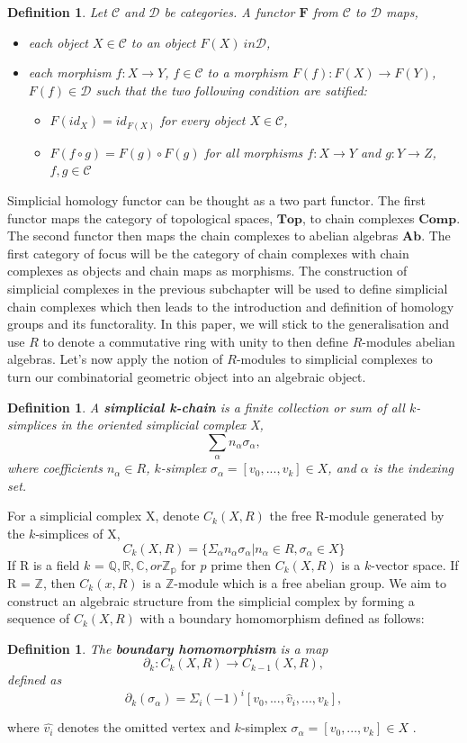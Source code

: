 \documentclass{article}
\newcommand{\be}{\begin{equation}}
\newcommand{\ee}{\end{equation}}
\newtheorem{definition}[theorem]{Definition}
\begin{document}
\begin{definition} Let $\mathcal{C}$ and $\mathcal{D}$ be categories. A functor $\textbf{F}$ from $\mathcal{C}$ to $\mathcal{D}$ maps,
\begin{itemize}
    \item each object $X \in \mathcal{C}$ to an object $F(X) \ in \mathcal{D}$,
    \item each morphism $f: X \to Y$, $f \in \mathcal{C}$ to a morphism $F(f): F(X) \to F(Y)$, $F(f) \in \mathcal{D}$ such that the two following condition are satified:
    \begin{itemize}
        \item $F(id_{X}) = id_{F(X)}$ for every object $X \in \mathcal{C}$,
        \item $F(f \circ g) = F(g) \circ F(g)$ for all morphisms $f:X \to Y$ and $g:Y \to Z$, $f,g \in \mathcal{C}$
    \end{itemize}
\end{itemize}
\end{definition}
Simplicial homology functor can be thought as a two part functor. The first functor maps the category of topological spaces, $\textbf{Top}$, to chain complexes $\textbf{Comp}$. The second functor then maps the chain complexes to abelian algebras $\textbf{Ab}$. The first category of focus will be the category of chain complexes with chain complexes as objects and chain maps as morphisms. The construction of simplicial complexes in the previous subchapter will be used to define simplicial chain complexes which then leads to the introduction and definition of homology groups and its functorality.  
In this paper, we will stick to the generalisation and use $R$ to denote a commutative ring with unity to then define $R$-modules abelian algebras.
Let's now apply the notion of $R$-modules to simplicial complexes to turn our combinatorial geometric object into an algebraic object.
\begin{definition}
A \textbf{simplicial k-chain} is a finite collection or sum of all $k$-simplices in the oriented simplicial complex X,
\be
\sum_\alpha n_\alpha \sigma_\alpha ,
\ee
where coefficients $n_\alpha \in R$, $k$-simplex $\sigma_\alpha = [v_0,...,v_k] \in X$, and $\alpha$ is the indexing set.
\end{definition}
For a simplicial complex X, denote $C_k(X,R)$ the free R-module generated by the $k$-simplices of X,
\be
C_k(X,R) = \{\Sigma_\alpha n_\alpha \sigma_\alpha | n_\alpha \in R, \sigma_\alpha \in X\}
\ee
If R is a field $k$ = $\mathbb{Q}, \mathbb{R}, \mathbb{C}, or \mathbb{Z_p}$ for $p$ prime then $C_k(X,R)$ is a $k$-vector space. If R = $\mathbb{Z}$, then $C_k(x,R)$ is a $\mathbb{Z}$-module which is a free abelian group. We aim to construct an algebraic structure from the simplicial complex by forming a sequence of $C_k(X,R)$ with a boundary homomorphism defined as follows:
\begin{definition}
    The \textbf{boundary homomorphism} is a map
\be
\partial_k : C_k(X,R) \rightarrow C_{k-1}(X,R),
\ee
defined as
\be
\partial_k(\sigma_\alpha) = \Sigma_i (-1)^i [v_0,...,\hat{v}_i,...,v_k],
\ee
\end{definition} where $\hat{v_i}$ denotes the omitted vertex and $k$-simplex $\sigma_\alpha = [v_0,...,v_k] \in X$ .
\end{document}
